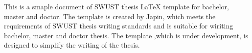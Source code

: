 \begin{abstract}
  本文是西南科技大学本科、硕士及博士毕业论文~\LaTeX{}~模板示例文件。本
  模板由~Japin~创建，它遵循西南科技大学的论文撰写规范，适合撰写本科、
  硕士及博士学位论文。该模板旨在简化学位论文的撰写，目前该模板尚处于开
  发状态。
\end{abstract}


\begin{englishabstract}
  This is a smaple document of SWUST thesis \LaTeX{} template for
  bachelor, master and doctor. The template is created by Japin, which
  meets the requirements of SWUST thesis writing standards and is
  suitable for wiriting bachelor, master and doctor thesis. The
  template ,which is under development, is designed to simplify the
  writing of the thesis.
\end{englishabstract}


